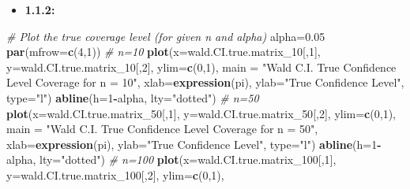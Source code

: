 \documentclass[]{article}
\newenvironment{Shaded}{\begin{snugshade}}{\end{snugshade}}
\newcommand{\CommentTok}[1]{\textcolor[rgb]{0.56,0.35,0.01}{\textit{#1}}}
\newcommand{\DataTypeTok}[1]{\textcolor[rgb]{0.13,0.29,0.53}{#1}}
\newcommand{\DecValTok}[1]{\textcolor[rgb]{0.00,0.00,0.81}{#1}}
\newcommand{\FloatTok}[1]{\textcolor[rgb]{0.00,0.00,0.81}{#1}}
\newcommand{\KeywordTok}[1]{\textcolor[rgb]{0.13,0.29,0.53}{\textbf{#1}}}
\newcommand{\NormalTok}[1]{#1}
\newcommand{\OperatorTok}[1]{\textcolor[rgb]{0.81,0.36,0.00}{\textbf{#1}}}
\newcommand{\StringTok}[1]{\textcolor[rgb]{0.31,0.60,0.02}{#1}}
\providecommand{\tightlist}{%
  \setlength{\itemsep}{0pt}\setlength{\parskip}{0pt}}
\begin{document}
\vspace{0.25in}

\begin{itemize}
\tightlist
\item
  \textbf{1.1.2:}
\end{itemize}

\begin{Shaded}
\begin{Highlighting}[]
\CommentTok{# Plot the true coverage level (for given n and alpha)}
\NormalTok{alpha=}\FloatTok{0.05}
\KeywordTok{par}\NormalTok{(}\DataTypeTok{mfrow=}\KeywordTok{c}\NormalTok{(}\DecValTok{4}\NormalTok{,}\DecValTok{1}\NormalTok{))}
\CommentTok{# n=10}
\KeywordTok{plot}\NormalTok{(}\DataTypeTok{x=}\NormalTok{wald.CI.true.matrix_}\DecValTok{10}\NormalTok{[,}\DecValTok{1}\NormalTok{],}
     \DataTypeTok{y=}\NormalTok{wald.CI.true.matrix_}\DecValTok{10}\NormalTok{[,}\DecValTok{2}\NormalTok{],}
     \DataTypeTok{ylim=}\KeywordTok{c}\NormalTok{(}\DecValTok{0}\NormalTok{,}\DecValTok{1}\NormalTok{),}
     \DataTypeTok{main =} \StringTok{"Wald C.I. True Confidence Level Coverage for n = 10"}\NormalTok{, }\DataTypeTok{xlab=}\KeywordTok{expression}\NormalTok{(pi),}
     \DataTypeTok{ylab=}\StringTok{"True Confidence Level"}\NormalTok{,}
     \DataTypeTok{type=}\StringTok{"l"}\NormalTok{)}
\KeywordTok{abline}\NormalTok{(}\DataTypeTok{h=}\DecValTok{1}\OperatorTok{-}\NormalTok{alpha, }\DataTypeTok{lty=}\StringTok{"dotted"}\NormalTok{)}
\CommentTok{# n=50}
\KeywordTok{plot}\NormalTok{(}\DataTypeTok{x=}\NormalTok{wald.CI.true.matrix_}\DecValTok{50}\NormalTok{[,}\DecValTok{1}\NormalTok{],}
     \DataTypeTok{y=}\NormalTok{wald.CI.true.matrix_}\DecValTok{50}\NormalTok{[,}\DecValTok{2}\NormalTok{],}
     \DataTypeTok{ylim=}\KeywordTok{c}\NormalTok{(}\DecValTok{0}\NormalTok{,}\DecValTok{1}\NormalTok{),}
     \DataTypeTok{main =} \StringTok{"Wald C.I. True Confidence Level Coverage for n = 50"}\NormalTok{, }\DataTypeTok{xlab=}\KeywordTok{expression}\NormalTok{(pi),}
     \DataTypeTok{ylab=}\StringTok{"True Confidence Level"}\NormalTok{,}
     \DataTypeTok{type=}\StringTok{"l"}\NormalTok{)}
\KeywordTok{abline}\NormalTok{(}\DataTypeTok{h=}\DecValTok{1}\OperatorTok{-}\NormalTok{alpha, }\DataTypeTok{lty=}\StringTok{"dotted"}\NormalTok{)}
\CommentTok{# n=100}
\KeywordTok{plot}\NormalTok{(}\DataTypeTok{x=}\NormalTok{wald.CI.true.matrix_}\DecValTok{100}\NormalTok{[,}\DecValTok{1}\NormalTok{],}
     \DataTypeTok{y=}\NormalTok{wald.CI.true.matrix_}\DecValTok{100}\NormalTok{[,}\DecValTok{2}\NormalTok{],}
     \DataTypeTok{ylim=}\KeywordTok{c}\NormalTok{(}\DecValTok{0}\NormalTok{,}\DecValTok{1}\NormalTok{),}

\end{Highlighting}
\end{Shaded}
\end{document}
